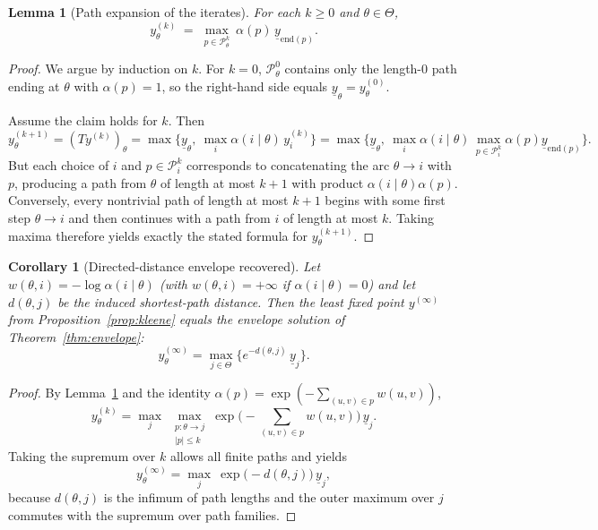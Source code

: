 \documentclass[final,3p,times]{elsarticle}
\theoremstyle{plain}
\newtheorem{lemma}{Lemma}
\newtheorem{corollary}{Corollary}
\theoremstyle{definition}
\newcommand{\1}{\mathbbm{1}}
\newcommand{\ThetaSet}{\Theta}
\begin{document}
\begin{lemma}[Path expansion of the iterates]\label{lem:path-expansion}
For each $k\ge 0$ and $\theta\in\ThetaSet$,
\[
y^{(k)}_\theta \;=\; \max_{p\in\mathcal{P}^k_{\theta}}\ \alpha(p)\,\underline y_{\mathrm{end}(p)}.
\]
\end{lemma}

\begin{proof}
We argue by induction on $k$. For $k=0$, $\mathcal{P}^0_{\theta}$ contains only the length-$0$ path ending at $\theta$ with $\alpha(p)=1$,
so the right-hand side equals $\underline y_\theta=y^{(0)}_\theta$.

Assume the claim holds for $k$. Then
\[
y^{(k+1)}_\theta=(Ty^{(k)})_\theta
=\max\Big\{\underline y_\theta,\ \max_{i}\alpha(i\mid\theta)\,y^{(k)}_i\Big\}
=\max\Big\{\underline y_\theta,\ \max_i\alpha(i\mid\theta)\,\max_{p\in\mathcal{P}^k_i}\alpha(p)\underline y_{\mathrm{end}(p)}\Big\}.
\]
But each choice of $i$ and $p\in\mathcal{P}^k_i$ corresponds to concatenating the arc $\theta\to i$ with $p$, producing a path from $\theta$
of length at most $k+1$ with product $\alpha(i\mid\theta)\alpha(p)$. Conversely, every nontrivial path of length at most $k+1$ begins with some first step
$\theta\to i$ and then continues with a path from $i$ of length at most $k$. Taking maxima therefore yields exactly the stated formula for $y^{(k+1)}_\theta$.
\end{proof}

\begin{corollary}[Directed-distance envelope recovered]\label{cor:envelope-from-fp}
Let $w(\theta,i)=-\log\alpha(i\mid\theta)$ (with $w(\theta,i)=+\infty$ if $\alpha(i\mid\theta)=0$) and let $d(\theta,j)$ be the induced shortest-path distance.
Then the least fixed point $y^{(\infty)}$ from Proposition~\ref{prop:kleene} equals the envelope solution of Theorem~\ref{thm:envelope}:
\[
y^{(\infty)}_\theta
=\max_{j\in\ThetaSet}\Big\{e^{-d(\theta,j)}\,\underline y_j\Big\}.
\]
\end{corollary}

\begin{proof}
By Lemma~\ref{lem:path-expansion} and the identity $\alpha(p)=\exp(-\sum_{(u,v)\in p} w(u,v))$,
\[
y^{(k)}_\theta
=\max_{j}\ \max_{\substack{p:\theta\to j\\ |p|\le k}}\exp\!\Big(-\sum_{(u,v)\in p} w(u,v)\Big)\,\underline y_j.
\]
Taking the supremum over $k$ allows all finite paths and yields
\[
y^{(\infty)}_\theta=\max_{j}\ \exp\!\big(-d(\theta,j)\big)\,\underline y_j,
\]
because $d(\theta,j)$ is the infimum of path lengths and the outer maximum over $j$ commutes with the supremum over path families.
\end{proof}
\end{document}
